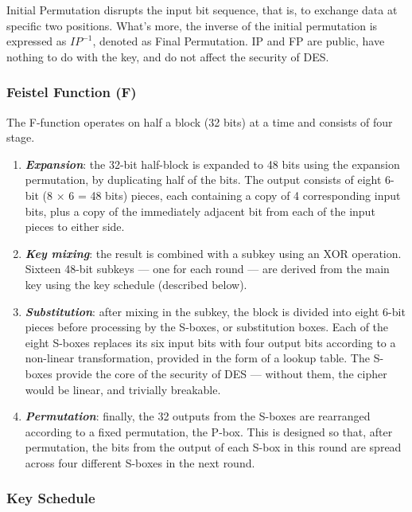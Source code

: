 \documentclass[11pt]{article}
\begin{document}
Initial Permutation disrupts the input bit sequence, that is, to exchange data at specific two positions. What's more, the inverse of the initial permutation is expressed as $IP^{-1}$, denoted as Final Permutation. IP and FP are public, have nothing to do with the key, and do not affect the security of DES.

\subsubsection{Feistel Function (F)}
The F-function operates on half a block (32 bits) at a time and consists of four stage.

\begin{enumerate}
    \item \textbf{\textit{Expansion}}: the 32-bit half-block is expanded to 48 bits using the expansion permutation, by duplicating half of the bits. The output consists of eight 6-bit (8 × 6 = 48 bits) pieces, each containing a copy of 4 corresponding input bits, plus a copy of the immediately adjacent bit from each of the input pieces to either side.
    \item \textbf{\textit{Key mixing}}: the result is combined with a subkey using an XOR operation. Sixteen 48-bit subkeys — one for each round — are derived from the main key using the key schedule (described below).
    \item \textbf{\textit{Substitution}}: after mixing in the subkey, the block is divided into eight 6-bit pieces before processing by the S-boxes, or substitution boxes. Each of the eight S-boxes replaces its six input bits with four output bits according to a non-linear transformation, provided in the form of a lookup table. The S-boxes provide the core of the security of DES — without them, the cipher would be linear, and trivially breakable.
    \item \textbf{\textit{Permutation}}: finally, the 32 outputs from the S-boxes are rearranged according to a fixed permutation, the P-box. This is designed so that, after permutation, the bits from the output of each S-box in this round are spread across four different S-boxes in the next round.
\end{enumerate}

\subsubsection{Key Schedule}
\end{document}
